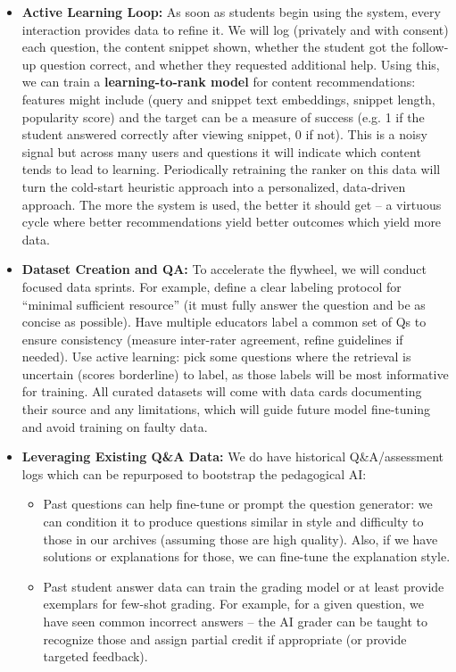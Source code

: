 \documentclass[11pt]{article}
\begin{document}
\begin{itemize}
  \item \textbf{Active Learning Loop:} As soon as students begin using the system, every interaction provides data to refine it. We will log (privately and with consent) each question, the content snippet shown, whether the student got the follow-up question correct, and whether they requested additional help. Using this, we can train a \textbf{learning-to-rank model} for content recommendations: features might include (query and snippet text embeddings, snippet length, popularity score) and the target can be a measure of success (e.g. 1 if the student answered correctly after viewing snippet, 0 if not). This is a noisy signal but across many users and questions it will indicate which content tends to lead to learning. Periodically retraining the ranker on this data will turn the cold-start heuristic approach into a personalized, data-driven approach. The more the system is used, the better it should get – a virtuous cycle where better recommendations yield better outcomes which yield more data.
  \item \textbf{Dataset Creation and QA:} To accelerate the flywheel, we will conduct focused data sprints. For example, define a clear labeling protocol for “minimal sufficient resource” (it must fully answer the question and be as concise as possible). Have multiple educators label a common set of Qs to ensure consistency (measure inter-rater agreement, refine guidelines if needed). Use active learning: pick some questions where the retrieval is uncertain (scores borderline) to label, as those labels will be most informative for training. All curated datasets will come with data cards documenting their source and any limitations, which will guide future model fine-tuning and avoid training on faulty data.
  \item \textbf{Leveraging Existing Q\&A Data:} We do have historical Q\&A/assessment logs which can be repurposed to bootstrap the pedagogical AI:
    \begin{itemize}
      \item Past questions can help fine-tune or prompt the question generator: we can condition it to produce questions similar in style and difficulty to those in our archives (assuming those are high quality). Also, if we have solutions or explanations for those, we can fine-tune the explanation style.
      \item Past student answer data can train the grading model or at least provide exemplars for few-shot grading. For example, for a given question, we have seen common incorrect answers – the AI grader can be taught to recognize those and assign partial credit if appropriate (or provide targeted feedback).

\end{itemize}
\end{itemize}
\end{document}

